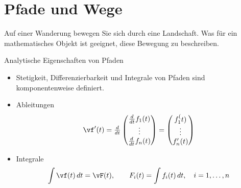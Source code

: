 \mode*

\section{Pfade und Wege}

\begin{frame}
    \begin{Denkpause}
        Auf einer Wanderung bewegen Sie sich durch eine Landschaft. Was für ein mathematisches Objekt ist geeignet, diese Bewegung zu beschreiben.
    \end{Denkpause}
\end{frame}

\begin{frame}{Analytische Eigenschaften von Pfaden}
    \begin{itemize}
        \item Stetigkeit, Differenzierbarkeit und Integrale von Pfaden sind komponentenweise definiert.
        \item Ableitungen
        \begin{gather*}
            \vf'(t) = \tfrac{d}{dt}
            \begin{pmatrix}
                \tfrac{d}{dt} f_1(t)\\
                \vdots\\
                \tfrac{d}{dt} f_n(t)
            \end{pmatrix}
            = \begin{pmatrix}
                f_1^(t)\\\vdots\\f_n'(t)
            \end{pmatrix}
        \end{gather*}
        \item Integrale
        \begin{gather*}
            \int \vf(t)\,dt = \vF(t),
        \qquad F_i(t) = \int f_i(t)\,dt,\quad i=1,\dots,n
        \end{gather*}
    \end{itemize}
\end{frame}

